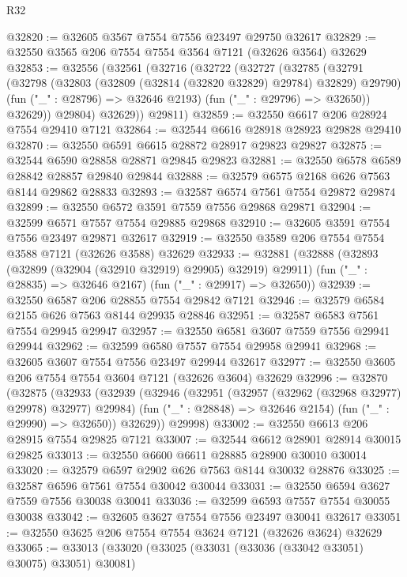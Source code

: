\begin{lexlean}{R32}
\begin{coremodule}
@32820 := @32605 @3567 @7554 @7556 @23497 @29750 @32617
@32829 := @32550 @3565 @206 @7554 @7554 @3564 @7121 (@32626 @3564) @32629
@32853 := @32556
    (@32561
      (@32716
        (@32722
          (@32727
            (@32785
              (@32791
                (@32798
                  (@32803 (@32809 (@32814 (@32820 @32829) @29784) @32829) @29790)
                  (fun ("_" : @28796) => @32646 @2193)
                  (fun ("_" : @29796) => @32650))
                @32629))
            @29804)
          @32629))
      @29811)
@32859 := @32550 @6617 @206 @28924 @7554 @29410 @7121
@32864 := @32544 @6616 @28918 @28923 @29828 @29410
@32870 := @32550 @6591 @6615 @28872 @28917 @29823 @29827
@32875 := @32544 @6590 @28858 @28871 @29845 @29823
@32881 := @32550 @6578 @6589 @28842 @28857 @29840 @29844
@32888 := @32579 @6575 @2168 @626 @7563 @8144 @29862 @28833
@32893 := @32587 @6574 @7561 @7554 @29872 @29874
@32899 := @32550 @6572 @3591 @7559 @7556 @29868 @29871
@32904 := @32599 @6571 @7557 @7554 @29885 @29868
@32910 := @32605 @3591 @7554 @7556 @23497 @29871 @32617
@32919 := @32550 @3589 @206 @7554 @7554 @3588 @7121 (@32626 @3588) @32629
@32933 := @32881
    (@32888
      (@32893 (@32899 (@32904 (@32910 @32919) @29905) @32919) @29911)
      (fun ("_" : @28835) => @32646 @2167)
      (fun ("_" : @29917) => @32650))
@32939 := @32550 @6587 @206 @28855 @7554 @29842 @7121
@32946 := @32579 @6584 @2155 @626 @7563 @8144 @29935 @28846
@32951 := @32587 @6583 @7561 @7554 @29945 @29947
@32957 := @32550 @6581 @3607 @7559 @7556 @29941 @29944
@32962 := @32599 @6580 @7557 @7554 @29958 @29941
@32968 := @32605 @3607 @7554 @7556 @23497 @29944 @32617
@32977 := @32550 @3605 @206 @7554 @7554 @3604 @7121 (@32626 @3604) @32629
@32996 := @32870
    (@32875
      (@32933
        (@32939
          (@32946
            (@32951 (@32957 (@32962 (@32968 @32977) @29978) @32977) @29984)
            (fun ("_" : @28848) => @32646 @2154)
            (fun ("_" : @29990) => @32650))
          @32629))
      @29998)
@33002 := @32550 @6613 @206 @28915 @7554 @29825 @7121
@33007 := @32544 @6612 @28901 @28914 @30015 @29825
@33013 := @32550 @6600 @6611 @28885 @28900 @30010 @30014
@33020 := @32579 @6597 @2902 @626 @7563 @8144 @30032 @28876
@33025 := @32587 @6596 @7561 @7554 @30042 @30044
@33031 := @32550 @6594 @3627 @7559 @7556 @30038 @30041
@33036 := @32599 @6593 @7557 @7554 @30055 @30038
@33042 := @32605 @3627 @7554 @7556 @23497 @30041 @32617
@33051 := @32550 @3625 @206 @7554 @7554 @3624 @7121 (@32626 @3624) @32629
@33065 := @33013
    (@33020
      (@33025 (@33031 (@33036 (@33042 @33051) @30075) @33051) @30081)

\end{coremodule}
\end{lexlean}
